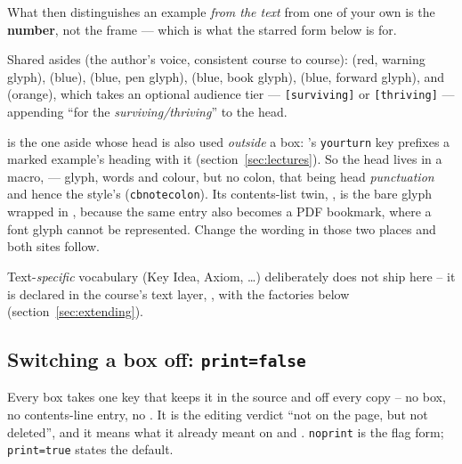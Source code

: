 What then distinguishes an example \emph{from the text} from one of your
own is the \textbf{number}, not the frame --- which is what the starred
form below is for.

Shared asides (the author's voice, consistent course to course):
 (red, warning glyph),  (blue),
 (blue, pen glyph),  (blue, book glyph),
 (blue, forward glyph), and  (orange), which takes
an optional audience tier --- \texttt{[surviving]} or \texttt{[thriving]} ---
appending ``for the \emph{surviving/thriving}'' to the head.

 is the one aside whose head is also used \emph{outside} a box:
's \texttt{yourturn} key prefixes a marked example's heading
with it (section~\ref{sec:lectures}). So the head lives in a macro,
 --- glyph, words and colour, but no colon, that being head
\emph{punctuation} and hence the style's (\texttt{cbnotecolon}). Its contents-list
twin, , is the bare glyph wrapped in ,
because the same entry also becomes a PDF bookmark, where a font glyph cannot be
represented. Change the wording in those two places and both sites follow.

Text-\emph{specific} vocabulary (Key Idea, Axiom, \dots) deliberately does
not ship here -- it is declared in the course's text layer,
, with the factories below
(section~\ref{sec:extending}).

\subsection*{Switching a box off: \texttt{print=false}}\label{sec:print-key}

Every box takes one key that keeps it in the source and off every copy --
no box, no contents-line entry, no . It is the editing verdict
``not on the page, but not deleted'', and it means what it already meant on
 and . \texttt{noprint} is the flag form;
\texttt{print=true} states the default.


